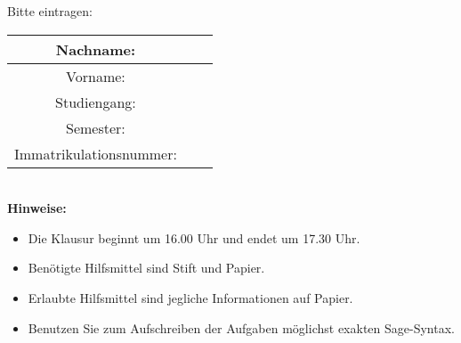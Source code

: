\bigskip\bigskip\bigskip
Bitte eintragen:\\
\begin{center}
\begin{tabular}{|Sl|p{8cm}|}
\hline
Nachname: & \\
\hline
Vorname: & \\
\hline
Studiengang: & \\
\hline 
Semester: & \\
\hline 
Immatrikulationsnummer: & \\
\hline
\end{tabular}\\[1cm]
\textbf{Hinweise:}
\begin{itemize}
\item Die Klausur beginnt um 16.00 Uhr und endet um 17.30 Uhr.
\item Benötigte Hilfsmittel sind Stift und Papier.
\item Erlaubte Hilfsmittel sind jegliche Informationen auf Papier. 
\item Benutzen Sie zum Aufschreiben der Aufgaben möglichst exakten Sage-Syntax.
\end{itemize}
\end{center}

\newpage
\normalsize
